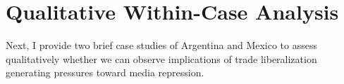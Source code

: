 \documentclass[12pt,a4paper]{article}\usepackage[]{graphicx}\usepackage[]{color}
\begin{document}
% 
% 




\section{Qualitative Within-Case Analysis}

Next, I provide two brief case studies of Argentina and Mexico to assess qualitatively whether we can observe implications of trade liberalization generating pressures toward media repression.
\end{document}
